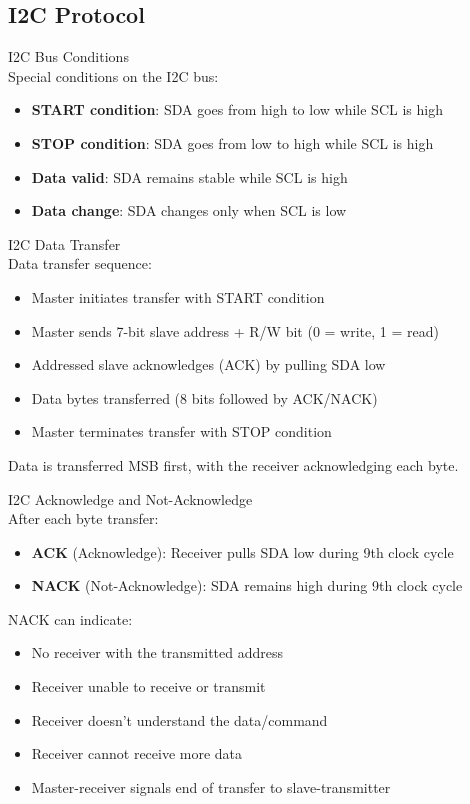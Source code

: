 \subsection{I2C Protocol}

\begin{concept}{I2C Bus Conditions}\\
Special conditions on the I2C bus:
\begin{itemize}
    \item \textbf{START condition}: SDA goes from high to low while SCL is high
    \item \textbf{STOP condition}: SDA goes from low to high while SCL is high
    \item \textbf{Data valid}: SDA remains stable while SCL is high
    \item \textbf{Data change}: SDA changes only when SCL is low
\end{itemize}
\end{concept}

\begin{definition}{I2C Data Transfer}\\
Data transfer sequence:
\begin{itemize}
    \item Master initiates transfer with START condition
    \item Master sends 7-bit slave address + R/W bit (0 = write, 1 = read)
    \item Addressed slave acknowledges (ACK) by pulling SDA low
    \item Data bytes transferred (8 bits followed by ACK/NACK)
    \item Master terminates transfer with STOP condition
\end{itemize}
Data is transferred MSB first, with the receiver acknowledging each byte.
\end{definition}

\begin{concept}{I2C Acknowledge and Not-Acknowledge}\\
After each byte transfer:
\begin{itemize}
    \item \textbf{ACK} (Acknowledge): Receiver pulls SDA low during 9th clock cycle
    \item \textbf{NACK} (Not-Acknowledge): SDA remains high during 9th clock cycle
\end{itemize}
NACK can indicate:
\begin{itemize}
    \item No receiver with the transmitted address
    \item Receiver unable to receive or transmit
    \item Receiver doesn't understand the data/command
    \item Receiver cannot receive more data
    \item Master-receiver signals end of transfer to slave-transmitter
\end{itemize}
\end{concept}

